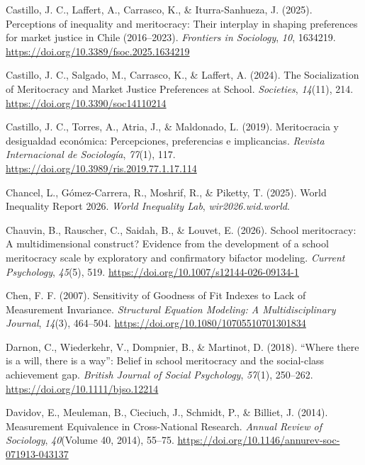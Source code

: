\documentclass[
  13pt,
]{article}
\newlength{\cslhangindent}
\newenvironment{CSLReferences}[2] %
 {\begin{list}{}{%
  \setlength{\itemindent}{0pt}
  \setlength{\leftmargin}{0pt}
  \setlength{\parsep}{0pt}
  \ifodd #1
   \setlength{\leftmargin}{\cslhangindent}
   \setlength{\itemindent}{-1\cslhangindent}
  \fi
  \setlength{\itemsep}{#2\baselineskip}}}
 {\end{list}}
\begin{document}
\begin{CSLReferences}{1}{0}
Castillo, J. C., Laffert, A., Carrasco, K., \& Iturra-Sanhueza, J.
(2025). Perceptions of inequality and meritocracy: Their interplay in
shaping preferences for market justice in {Chile} (2016--2023).
\emph{Frontiers in Sociology}, \emph{10}, 1634219.
\url{https://doi.org/10.3389/fsoc.2025.1634219}

Castillo, J. C., Salgado, M., Carrasco, K., \& Laffert, A. (2024). The
{Socialization} of {Meritocracy} and {Market Justice Preferences} at
{School}. \emph{Societies}, \emph{14}(11), 214.
\url{https://doi.org/10.3390/soc14110214}

Castillo, J. C., Torres, A., Atria, J., \& Maldonado, L. (2019).
Meritocracia y desigualdad económica: {Percepciones}, preferencias e
implicancias. \emph{Revista Internacional de Sociología}, \emph{77}(1),
117. \url{https://doi.org/10.3989/ris.2019.77.1.17.114}

Chancel, L., Gómez-Carrera, R., Moshrif, R., \& Piketty, T. (2025).
World {Inequality Report} 2026. \emph{World Inequality Lab},
\emph{wir2026.wid.world}.

Chauvin, B., Rauscher, C., Saidah, B., \& Louvet, E. (2026). School
meritocracy: A multidimensional construct? {Evidence} from the
development of a school meritocracy scale by exploratory and
confirmatory bifactor modeling. \emph{Current Psychology}, \emph{45}(5),
519. \url{https://doi.org/10.1007/s12144-026-09134-1}

Chen, F. F. (2007). Sensitivity of {Goodness} of {Fit Indexes} to {Lack}
of {Measurement Invariance}. \emph{Structural Equation Modeling: A
Multidisciplinary Journal}, \emph{14}(3), 464--504.
\url{https://doi.org/10.1080/10705510701301834}

Darnon, C., Wiederkehr, V., Dompnier, B., \& Martinot, D. (2018).
{``{Where} there is a will, there is a way''}: {Belief} in school
meritocracy and the social-class achievement gap. \emph{British Journal
of Social Psychology}, \emph{57}(1), 250--262.
\url{https://doi.org/10.1111/bjso.12214}

Davidov, E., Meuleman, B., Cieciuch, J., Schmidt, P., \& Billiet, J.
(2014). Measurement {Equivalence} in {Cross-National Research}.
\emph{Annual Review of Sociology}, \emph{40}(Volume 40, 2014), 55--75.
\url{https://doi.org/10.1146/annurev-soc-071913-043137}


\end{CSLReferences}
\end{document}
